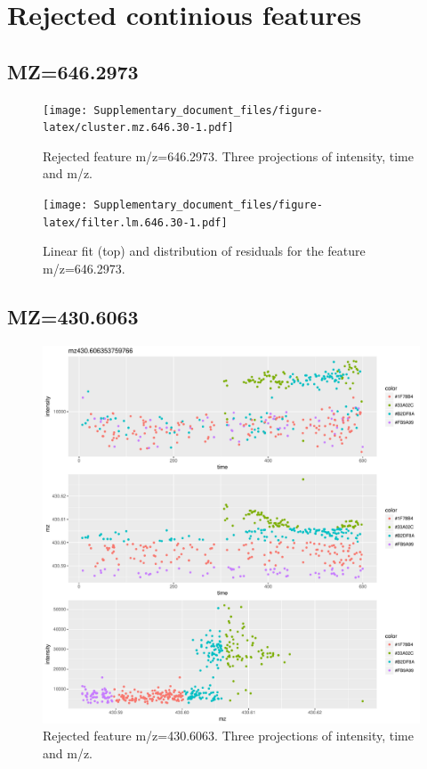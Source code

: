 \documentclass[]{article}
\begin{document}
\section{Rejected continious
features}\label{rejected-continious-features}

\subsection{MZ=646.2973}\label{mz646.2973}

\begin{figure}[H]
\begin{center}
\texttt{[image: Supplementary\_document\_files/figure-latex/cluster.mz.646.30-1.pdf]}
\caption{Rejected feature m/z=646.2973. Three projections of intensity, time and m/z.}
\label{fig:d3.mz.646.2973}
\end{center}
\end{figure}


\begin{figure}[H]
\begin{center}
\texttt{[image: Supplementary\_document\_files/figure-latex/filter.lm.646.30-1.pdf]}
\caption{Linear fit (top) and distribution of residuals for the  feature m/z=646.2973.}
\label{ig:chk.mz.646.2973}
\end{center}
\end{figure}


\subsection{MZ=430.6063}\label{mz430.6063}

\begin{figure}[H]
\begin{center}
\includegraphics{Supplementary_document_files/figure-latex/cluster.mz.430-1.pdf}
\caption{Rejected feature m/z=430.6063. Three projections of intensity, time and m/z.}
\label{fig:d3.mz.430.6063}
\end{center}
\end{figure}
\end{document}
